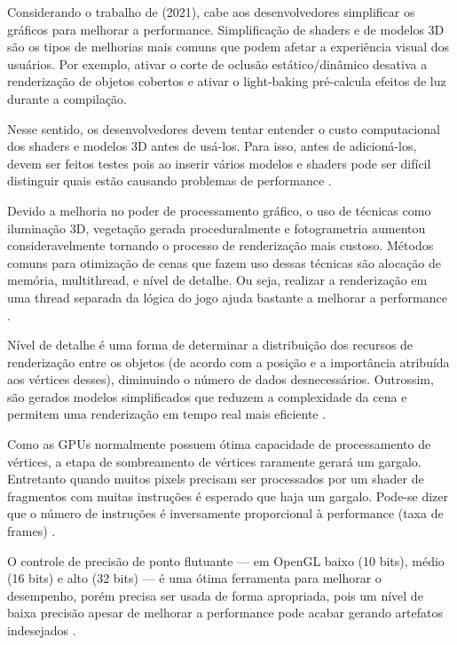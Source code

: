 Considerando o trabalho de  (2021), cabe aos desenvolvedores simplificar os gráficos para melhorar a performance. Simplificação de shaders e de modelos 3D são os tipos de melhorias mais comuns que podem afetar a experiência visual dos usuários. Por exemplo, ativar o corte de oclusão estático/dinâmico desativa a renderização de objetos cobertos e ativar o \Gls{light-baking} pré-calcula efeitos de luz durante a compilação.

Nesse sentido, os desenvolvedores devem tentar entender o custo computacional dos shaders e modelos 3D antes de usá-los. Para isso, antes de adicioná-los, devem ser feitos testes pois ao inserir vários modelos e shaders pode ser difícil distinguir quais estão causando problemas de performance \cite{nusrat2021commit}.

Devido a melhoria no poder de processamento gráfico, o uso de técnicas como iluminação 3D, vegetação gerada proceduralmente e fotogrametria aumentou consideravelmente tornando o processo de renderização mais custoso. Métodos comuns para otimização de cenas que fazem uso dessas técnicas são alocação de memória, \Gls{multithread}, e nível de detalhe. Ou seja, realizar a renderização em uma thread separada da lógica do jogo ajuda bastante a melhorar a performance \cite{zhang2017vegetation}.

Nível de detalhe é uma forma de determinar a distribuição dos recursos de renderização entre os objetos (de acordo com a posição e a importância atribuída aos vértices desses), diminuindo o número de dados desnecessários. Outrossim, são gerados modelos simplificados que reduzem a complexidade da cena e permitem uma renderização em tempo real mais eficiente \cite{zhang2017vegetation}.

Como as GPUs normalmente possuem ótima capacidade de processamento de vértices, a etapa de sombreamento de vértices raramente gerará um gargalo. Entretanto quando muitos pixels precisam ser processados por um shader de fragmentos com muitas instruções é esperado que haja um gargalo. Pode-se dizer que o número de instruções é inversamente proporcional à performance (taxa de frames) \cite{optimizationMobile}.

O controle de precisão de ponto flutuante --- em OpenGL baixo (10 bits), médio (16 bits) e alto (32 bits) --- é uma ótima ferramenta para melhorar o desempenho, porém precisa ser usada de forma apropriada, pois um nível de baixa precisão apesar de melhorar a performance pode acabar gerando artefatos indesejados \cite{optimizationMobile}.

